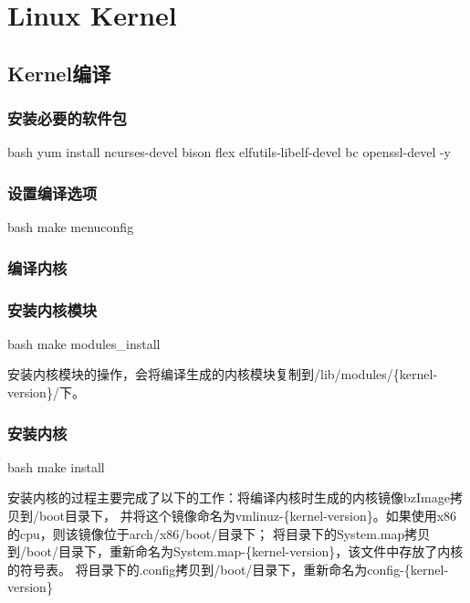 \section{Linux Kernel}
\subsection{Kernel编译}
\subsubsection{安装必要的软件包}
\begin{code-block}{bash}
yum install ncurses-devel bison flex elfutils-libelf-devel bc openssl-devel -y
\end{code-block}

\subsubsection{设置编译选项}
\begin{code-block}{bash}
make menuconfig
\end{code-block}

\subsubsection{编译内核}

\subsubsection{安装内核模块}
\begin{code-block}{bash}
make modules_install
\end{code-block}

安装内核模块的操作，会将编译生成的内核模块复制到/lib/modules/\{kernel-version\}/下。

\subsubsection{安装内核}
\begin{code-block}{bash}
make install
\end{code-block}

安装内核的过程主要完成了以下的工作：将编译内核时生成的内核镜像bzImage拷贝到/boot目录下，
并将这个镜像命名为vmlinuz-\{kernel-version\}。如果使用x86的cpu，则该镜像位于arch/x86/boot/目录下；
将目录下的System.map拷贝到/boot/目录下，重新命名为System.map-\{kernel-version\}，该文件中存放了内核的符号表。
将目录下的.config拷贝到/boot/目录下，重新命名为config-\{kernel-version\}

